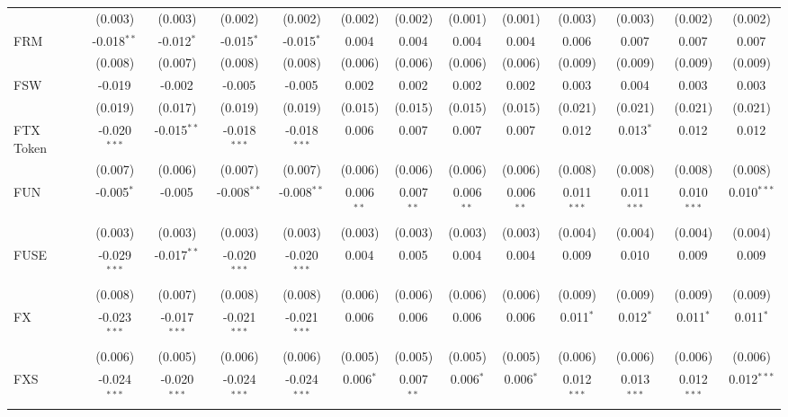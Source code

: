 \begin{table}[!htbp]
\begin{tabular}{@{\extracolsep{5pt}}lcccccccccccc}
  & (0.003) & (0.003) & (0.002) & (0.002) & (0.002) & (0.002) & (0.001) & (0.001) & (0.003) & (0.003) & (0.002) & (0.002) \\
 FRM & -0.018$^{**}$ & -0.012$^{*}$ & -0.015$^{*}$ & -0.015$^{*}$ & 0.004$^{}$ & 0.004$^{}$ & 0.004$^{}$ & 0.004$^{}$ & 0.006$^{}$ & 0.007$^{}$ & 0.007$^{}$ & 0.007$^{}$ \\
  & (0.008) & (0.007) & (0.008) & (0.008) & (0.006) & (0.006) & (0.006) & (0.006) & (0.009) & (0.009) & (0.009) & (0.009) \\
 FSW & -0.019$^{}$ & -0.002$^{}$ & -0.005$^{}$ & -0.005$^{}$ & 0.002$^{}$ & 0.002$^{}$ & 0.002$^{}$ & 0.002$^{}$ & 0.003$^{}$ & 0.004$^{}$ & 0.003$^{}$ & 0.003$^{}$ \\
  & (0.019) & (0.017) & (0.019) & (0.019) & (0.015) & (0.015) & (0.015) & (0.015) & (0.021) & (0.021) & (0.021) & (0.021) \\
 FTX Token & -0.020$^{***}$ & -0.015$^{**}$ & -0.018$^{***}$ & -0.018$^{***}$ & 0.006$^{}$ & 0.007$^{}$ & 0.007$^{}$ & 0.007$^{}$ & 0.012$^{}$ & 0.013$^{*}$ & 0.012$^{}$ & 0.012$^{}$ \\
  & (0.007) & (0.006) & (0.007) & (0.007) & (0.006) & (0.006) & (0.006) & (0.006) & (0.008) & (0.008) & (0.008) & (0.008) \\
 FUN & -0.005$^{*}$ & -0.005$^{}$ & -0.008$^{**}$ & -0.008$^{**}$ & 0.006$^{**}$ & 0.007$^{**}$ & 0.006$^{**}$ & 0.006$^{**}$ & 0.011$^{***}$ & 0.011$^{***}$ & 0.010$^{***}$ & 0.010$^{***}$ \\
  & (0.003) & (0.003) & (0.003) & (0.003) & (0.003) & (0.003) & (0.003) & (0.003) & (0.004) & (0.004) & (0.004) & (0.004) \\
 FUSE & -0.029$^{***}$ & -0.017$^{**}$ & -0.020$^{***}$ & -0.020$^{***}$ & 0.004$^{}$ & 0.005$^{}$ & 0.004$^{}$ & 0.004$^{}$ & 0.009$^{}$ & 0.010$^{}$ & 0.009$^{}$ & 0.009$^{}$ \\
  & (0.008) & (0.007) & (0.008) & (0.008) & (0.006) & (0.006) & (0.006) & (0.006) & (0.009) & (0.009) & (0.009) & (0.009) \\
 FX & -0.023$^{***}$ & -0.017$^{***}$ & -0.021$^{***}$ & -0.021$^{***}$ & 0.006$^{}$ & 0.006$^{}$ & 0.006$^{}$ & 0.006$^{}$ & 0.011$^{*}$ & 0.012$^{*}$ & 0.011$^{*}$ & 0.011$^{*}$ \\
  & (0.006) & (0.005) & (0.006) & (0.006) & (0.005) & (0.005) & (0.005) & (0.005) & (0.006) & (0.006) & (0.006) & (0.006) \\
 FXS & -0.024$^{***}$ & -0.020$^{***}$ & -0.024$^{***}$ & -0.024$^{***}$ & 0.006$^{*}$ & 0.007$^{**}$ & 0.006$^{*}$ & 0.006$^{*}$ & 0.012$^{***}$ & 0.013$^{***}$ & 0.012$^{***}$ & 0.012$^{***}$ \\

\end{tabular}
\end{table}
